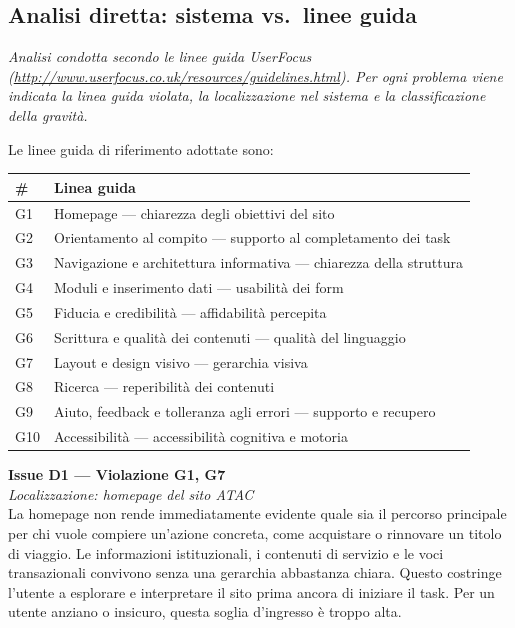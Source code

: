 \documentclass[11pt,a4paper]{article}
\begin{document}
\subsection*{Analisi diretta: sistema vs.\ linee guida}

\noindent\textit{Analisi condotta secondo le linee guida UserFocus (\url{http://www.userfocus.co.uk/resources/guidelines.html}). Per ogni problema viene indicata la linea guida violata, la localizzazione nel sistema e la classificazione della gravità.}

\bigskip

\noindent Le linee guida di riferimento adottate sono:

\begin{tabular}{ll}
\hline
\textbf{\#} & \textbf{Linea guida} \\
\hline
G1 & Homepage — chiarezza degli obiettivi del sito \\
G2 & Orientamento al compito — supporto al completamento dei task \\
G3 & Navigazione e architettura informativa — chiarezza della struttura \\
G4 & Moduli e inserimento dati — usabilità dei form \\
G5 & Fiducia e credibilità — affidabilità percepita \\
G6 & Scrittura e qualità dei contenuti — qualità del linguaggio \\
G7 & Layout e design visivo — gerarchia visiva \\
G8 & Ricerca — reperibilità dei contenuti \\
G9 & Aiuto, feedback e tolleranza agli errori — supporto e recupero \\
G10 & Accessibilità — accessibilità cognitiva e motoria \\
\hline
\end{tabular}

\bigskip

\noindent\textbf{Issue D1 — Violazione G1, G7}\label{atac:D1}\\
\textit{Localizzazione: homepage del sito ATAC}\\

\noindent La homepage non rende immediatamente evidente quale sia il percorso principale per chi vuole compiere un’azione concreta, come acquistare o rinnovare un titolo di viaggio. Le informazioni istituzionali, i contenuti di servizio e le voci transazionali convivono senza una gerarchia abbastanza chiara. Questo costringe l’utente a esplorare e interpretare il sito prima ancora di iniziare il task. Per un utente anziano o insicuro, questa soglia d’ingresso è troppo alta.
\end{document}
